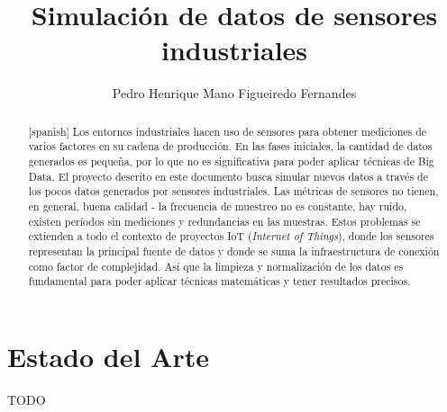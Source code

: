 \documentclass[11pt,spanish,listoffigures,listoftables]{tfgetsinf}
\title{Simulación de datos de sensores industriales}
\author{Pedro Henrique Mano Figueiredo Fernandes}
\begin{document}

\begin{abstract}[spanish]
Los entornos industriales hacen uso de sensores para obtener mediciones de varios factores en su cadena de producción. En las fases iniciales, la cantidad de datos generados es pequeña, por lo que no es significativa para poder aplicar técnicas de Big Data. El proyecto descrito en este documento busca simular nuevos datos a través de los pocos datos generados por sensores industriales. Las métricas de sensores no tienen, en general, buena calidad - la frecuencia de muestreo no es constante, hay ruido, existen períodos sin mediciones y redundancias en las muestras. Estos problemas se extienden a todo el contexto de proyectos IoT ({\em Internet of Things}), donde los sensores representan la principal fuente de datos y donde se suma la infraestructura de conexión como factor de complejidad. Así que la limpieza y normalización de los datos es fundamental para poder aplicar técnicas matemáticas y tener resultados precisos. 

\end{abstract}


\chapter{Estado del Arte}

TODO


\mainmatter


\end{document}

